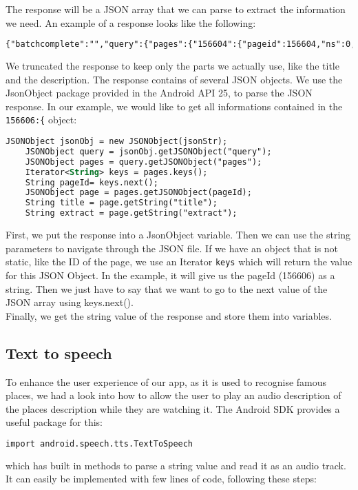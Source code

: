 The response will be a JSON array that we can parse to extract the information we need. An example of a response looks like the following:
\begin{lstlisting}[language=XML, basicstyle=\scriptsize]
    {"batchcomplete":"","query":{"pages":{"156604":{"pageid":156604,"ns":0,"title": "Brandenburg Gate","extract":"The Brandenburg Gate (German: Brandenburger Tor) is an 18th-century neoclassical monument in Berlin, and one of the best-known landmarks of Germany. It is built on the site of a former city gate that marked the start of the road from Berlin to the town of Brandenburg an der Havel....\n"}}}}
\end{lstlisting}
We truncated the response to keep only the parts we actually use, like the title and the description. The response contains of several JSON objects. We use the JsonObject package provided in the Android API 25, to parse the JSON response. In our example, we would like to get all informations contained in the \texttt{156606:\{} object:
\begin{lstlisting}[language=XML, basicstyle=\scriptsize]
    JSONObject jsonObj = new JSONObject(jsonStr);
    JSONObject query = jsonObj.getJSONObject("query");
    JSONObject pages = query.getJSONObject("pages");
    Iterator<String> keys = pages.keys();
    String pageId= keys.next();
    JSONObject page = pages.getJSONObject(pageId);
    String title = page.getString("title");
    String extract = page.getString("extract");
\end{lstlisting}
First, we put the response into a JsonObject variable. Then we can use the string parameters to navigate through the JSON file. If we have an object that is not static, like the ID of the page, we use an Iterator \texttt{keys} which will return the value for this JSON Object. In the example, it will give us the pageId (156606) as a string. Then we just have to say that we want to go to the next value of the JSON array using keys.next().\\
Finally, we get the string value of the response and store them into variables.

\subsection{Text to speech}
To enhance the user experience of our app, as it is used to recognise famous places, we had a look into how to allow the user to play an audio description of the places description while they are watching it. The Android SDK provides a useful package for this:
\begin{lstlisting}[language=XML, basicstyle=\scriptsize]
    import android.speech.tts.TextToSpeech
\end{lstlisting}
which has built in methods to parse a string value and read it as an audio track. It can easily be implemented with few lines of code, following these steps:\\\\

